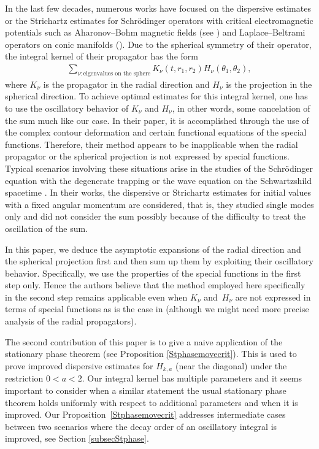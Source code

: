 \documentclass[10pt,a4paper]{amsart}
\numberwithin{equation}{section}
\def\n{\nu}
\begin{document}
In the last few decades, numerous works have focused on the dispersive estimates or the Strichartz estimates for Schr\"odinger operators with critical electromagnetic potentials such as Aharonov--Bohm magnetic fields (see \cite{FFFP1,FFFP2,FZZ,GYZZ}) and Laplace--Beltrami operators on conic manifolds (\cite{F,ZZ}). Due to the spherical symmetry of their operator, the integral kernel of their propagator has the form
\begin{align*}
\sum_{\n\colon \text{eigenvalues on the sphere}}K_{\n}(t,r_1,r_2)H_{\n}(\theta_1,\theta_2),
\end{align*}
where $K_{\n}$ is the propagator in the radial direction and $H_{\n}$ is the projection in the spherical direction. To achieve optimal estimates for this integral kernel, one has to use the oscillatory behavior of $K_{\n}$ and $H_{\n}$, in other words, some cancelation of the sum much like our case. In their paper, it is accomplished through the use of the complex contour deformation and certain functional equations of the special functions.
Therefore, their method appears to be inapplicable when the radial propagator or the spherical projection is not expressed by special functions. Typical scenarios involving these situations arise in the studies of the Schr\"odinger equation with the degenerate trapping \cite{C} or the wave equation on the Schwartzshild spacetime \cite{DSS}. In their works, the dispersive or Strichartz estimates for initial values with a fixed angular momentum are considered, that is, they studied single modes only and did not consider the sum possibly because of the difficulty to treat the oscillation of the sum.

In this paper, we deduce the asymptotic expansions of the radial direction and the spherical projection first and then sum up them by exploiting their oscillatory behavior. Specifically, we use the properties of the special functions in the first step only. Hence the authors believe that the method employed here specifically in the second step remains applicable even when $K_{\n}$ and~$H_{\n}$ are not expressed in terms of special functions as is the case in \cite{C,DSS} (although we might need more precise analysis of the radial propagators).

The second contribution of this paper is to give a naive application of the stationary phase theorem (see Proposition \ref{Stphasemovecrit}). This is used to prove improved dispersive estimates for $H_{k,a}$ (near the diagonal) under the restriction $0<a<2$. Our integral kernel has multiple parameters and it seems important to consider when a similar statement the usual stationary phase theorem holds uniformly with respect to additional parameters and when it is improved. Our Proposition~\ref{Stphasemovecrit} addresses intermediate cases between two scenarios where the decay order of an oscillatory integral is improved, see Section \ref{subsecStphase}.
\end{document}
